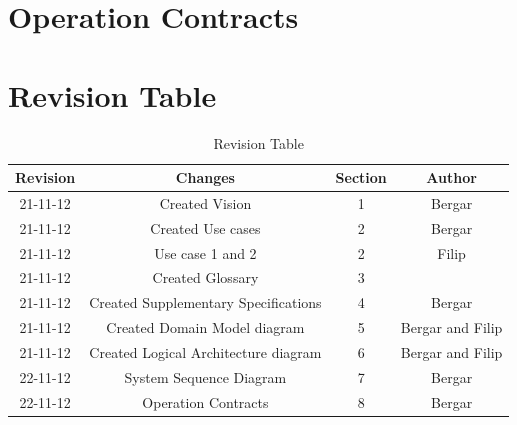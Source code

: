 \documentclass[11pt,a4paper]{article}
\begin{document}
\section{Operation Contracts}


\section{Revision Table}
\begin{table}[h]
\caption{Revision Table}
\begin{center}
\begin{tabular}{c|c|c|c}
\hline 
Revision & Changes & Section & Author \\ \hline 
21-11-12 & Created Vision & 1 & Bergar \\ 
21-11-12 & Created Use cases & 2 & Bergar \\
21-11-12 & Use case 1 and 2 & 2 & Filip \\
21-11-12 & Created Glossary & 3 & \\
21-11-12 & Created Supplementary Specifications & 4 & Bergar \\ 
21-11-12 & Created Domain Model diagram & 5 & Bergar and Filip \\
21-11-12 & Created Logical Architecture diagram & 6 & Bergar and Filip \\
\hline 
22-11-12 & System Sequence Diagram & 7 & Bergar \\
22-11-12 & Operation Contracts & 8 & Bergar \\
\hline
\end{tabular} 
\end{center}
\end{table}
	
\end{document}
